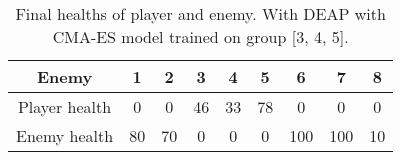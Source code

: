\begin{table}[ht]\centering
\begin{tabular}{|c|c|c|c|c|c|c|c|c|}
\hline
Enemy & 1 & 2 & 3 & 4 & 5 & 6 & 7 & 8\\
\hline
Player health & 0 & 0 & 46 & 33 & 78 & 0 & 0 & 0\\
\hline
Enemy health & 80 & 70 & 0 & 0 & 0 & 100 & 100 & 10\\
\hline
\end{tabular}
\caption{Final healths of player and enemy. With DEAP with CMA-ES  model trained on group [3, 4, 5].}
\label{tab:test_DEAP_3_4_5}
\end{table}